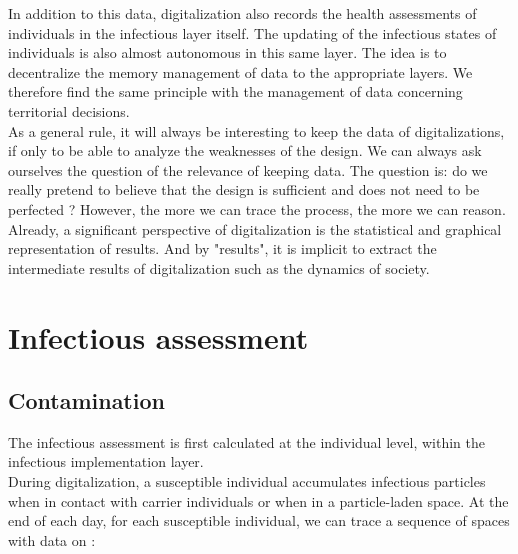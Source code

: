In addition to this data, digitalization also records the health assessments of individuals in the infectious layer itself. The updating of the infectious states of individuals is also almost autonomous in this same layer. The idea is to decentralize the memory management of data to the appropriate layers. We therefore find the same principle with the management of data concerning territorial decisions.\\

As a general rule, it will always be interesting to keep the data of digitalizations, if only to be able to analyze the weaknesses of the design. We can always ask ourselves the question of the relevance of keeping data. The question is: do we really pretend to believe that the design is sufficient and does not need to be perfected ? However, the more we can trace the process, the more we can reason.\\

Already, a significant perspective of digitalization is the statistical and graphical representation of results. And by "results", it is implicit to extract the intermediate results of digitalization such as the dynamics of society.\\

\newpage

\section{Infectious assessment}

\subsection{Contamination}

The infectious assessment is first calculated at the individual level, within the infectious implementation layer.\\

During digitalization, a susceptible individual accumulates infectious particles when in contact with carrier individuals or when in a particle-laden space. At the end of each day, for each susceptible individual, we can trace a sequence of spaces with data on :\\

